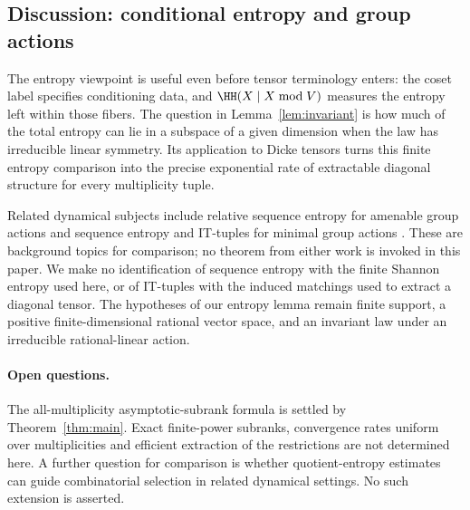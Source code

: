 \subsection*{Discussion: conditional entropy and group actions}

The entropy viewpoint is useful even before tensor terminology enters:
the coset label specifies conditioning data, and
$\HH(X\mid X\bmod V)$ measures the entropy left within those fibers.
The question in Lemma~\ref{lem:invariant} is how much of the total
entropy can lie in a subspace of a given dimension when the law has
irreducible linear symmetry. Its application to Dicke tensors turns
this finite entropy comparison into the precise exponential rate of
extractable diagonal structure for every multiplicity tuple.

Related dynamical subjects include relative sequence entropy for
amenable group actions \cite{LWW2025} and sequence entropy and IT-tuples
for minimal group actions \cite{LWX2025}. These are background topics
for comparison; no theorem from either work is invoked in this paper.
We make no identification of sequence entropy with the finite Shannon
entropy used here, or of IT-tuples with the induced matchings used to
extract a diagonal tensor. The hypotheses of our entropy lemma remain
finite support, a positive finite-dimensional rational vector space,
and an invariant law under an irreducible rational-linear action.

\paragraph{Open questions.}
The all-multiplicity asymptotic-subrank formula is settled by
Theorem~\ref{thm:main}. Exact finite-power subranks, convergence rates
uniform over multiplicities and efficient extraction of the restrictions
are not determined here. A further question for comparison is whether
quotient-entropy estimates can guide combinatorial selection in related
dynamical settings. No such extension is asserted.
